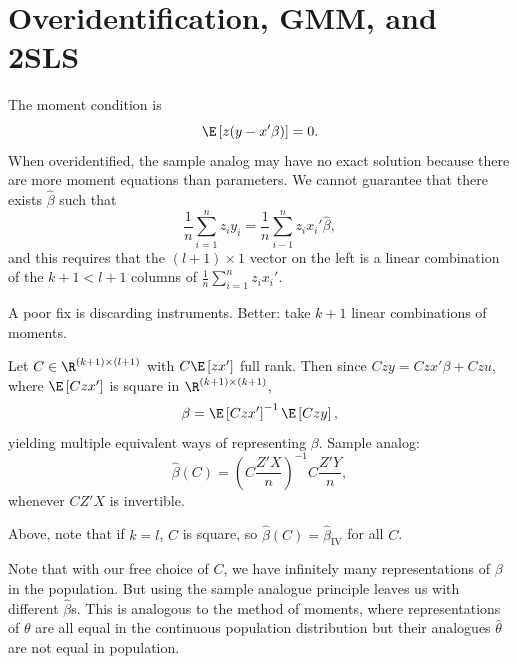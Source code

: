 \section{Overidentification, GMM, and 2SLS}

\begin{remark}
	The moment condition is \[
		\E\left[z(y-x'\beta)\right]=0
	.\]
	When overidentified, the sample analog may have no exact solution because there are more moment equations than parameters.
	We cannot guarantee that there exists $\hat{\beta}$ such that \[
		\frac{1}{n} \sum\limits_{i=1}^{n} z_i y_i  = \frac{1}{n} \sum\limits_{i-1}^{n} z_i x_i' \hat{\beta}
	,\] 
	and this requires that the $(l+1)\times 1$ vector on the left is a linear combination of the $k+1 < l+1$ columns of $\frac{1}{n} \sum_{i=1}^{n} z_i x_i'$.

	A poor fix is discarding instruments. Better: take $k+1$ linear combinations of moments.
\end{remark}

\begin{definition}
	Let $C\in\R^{(k+1)\times(l+1)}$ with $C\E\left[zx'\right]$ full rank. Then since $Czy = Czx'\beta + Czu$, where $\E\left[Czx'\right] $ is square in $\R^{(k+1)\times (k+1)}$, \[
		\beta = \E\left[Czx'\right]^{-1}\E\left[Czy\right]
	,\]
	yielding multiple equivalent ways of representing $\beta$.
	Sample analog: \[
		\hat{\beta}(C) = \left(C\frac{Z'X}{n}\right)^{-1}C\frac{Z'Y}{n}
	,\]
	whenever $CZ'X$ is invertible.
\end{definition}

Above, note that if $k=l$, $C$ is square, so $\hat{\beta}(C) = \hat{\beta}_{\text{IV}}$ for all $C$.

Note that with our free choice of $C$, we have infinitely many representations of $\beta$ in the population. But using the sample analogue principle leaves us with different $\hat{\beta}$s. This is analogous to the method of moments, where representations of $\theta$ are all equal in the continuous population distribution but their analogues $\hat{\theta}$ are not equal in population.


